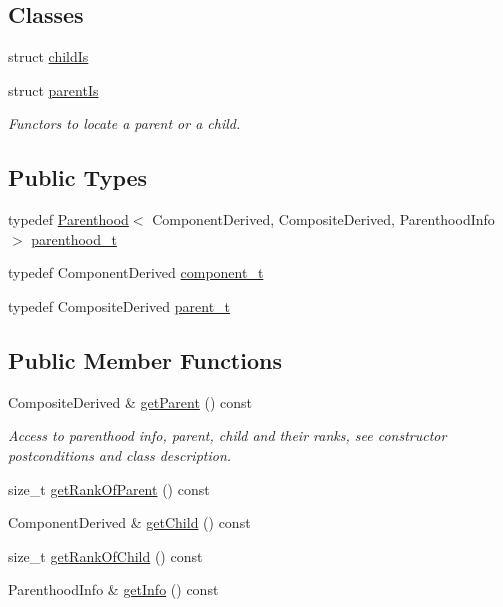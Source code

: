 \subsection*{Classes}
\begin{DoxyCompactItemize}
\item 
struct \hyperlink{structocra_1_1Parenthood_1_1childIs}{child\+Is}
\item 
struct \hyperlink{structocra_1_1Parenthood_1_1parentIs}{parent\+Is}
\begin{DoxyCompactList}\small\item\em Functors to locate a parent or a child. \end{DoxyCompactList}\end{DoxyCompactItemize}
\subsection*{Public Types}
\begin{DoxyCompactItemize}
\item 
typedef \hyperlink{classocra_1_1Parenthood}{Parenthood}$<$ Component\+Derived, Composite\+Derived, Parenthood\+Info $>$ \hyperlink{classocra_1_1Parenthood_acdae20cb747190b5dc9dbe42290bde78}{parenthood\+\_\+t}
\item 
typedef Component\+Derived \hyperlink{classocra_1_1Parenthood_a44b601577125fe0fd1d1e5ae4f143349}{component\+\_\+t}
\item 
typedef Composite\+Derived \hyperlink{classocra_1_1Parenthood_a2f95265c57cf96bbc26afee2ac757dd6}{parent\+\_\+t}
\end{DoxyCompactItemize}
\subsection*{Public Member Functions}
{\bf }\par
\begin{DoxyCompactItemize}
\item 
Composite\+Derived \& \hyperlink{classocra_1_1Parenthood_af177c0f77e5448b9d2ce8d795d143f45}{get\+Parent} () const 
\begin{DoxyCompactList}\small\item\em Access to parenthood info, parent, child and their ranks, see constructor postconditions and class description. \end{DoxyCompactList}\item 
size\+\_\+t \hyperlink{classocra_1_1Parenthood_a153c882cff8f67fb99c6877c5a6f1900}{get\+Rank\+Of\+Parent} () const 
\item 
Component\+Derived \& \hyperlink{classocra_1_1Parenthood_ae574a4ecbcc5b7adcdff9692329579c3}{get\+Child} () const 
\item 
size\+\_\+t \hyperlink{classocra_1_1Parenthood_a3d35a5aea168f1cf84caab9e3afaed88}{get\+Rank\+Of\+Child} () const 
\item 
Parenthood\+Info \& \hyperlink{classocra_1_1Parenthood_a6cb1e729695380bdf0f303b7399a9e55}{get\+Info} () const 
\end{DoxyCompactItemize}

